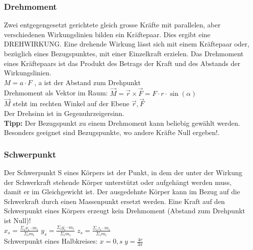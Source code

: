 \subsubsection{Drehmoment}
\begin{minipage}{15cm}
Zwei entgegengesetzt gerichtete gleich grosse Kräfte mit 
parallelen, aber verschiedenen Wirkungslinien bilden ein 
Kräftepaar. Dies ergibt eine DREHWIRKUNG.
Eine drehende Wirkung lässt sich mit einem Kräftepaar oder, 
bezüglich eines Bezugspunktes, mit einer Einzelkraft erzielen.
Das Drehmoment eines Kräftepaars ist das Produkt des Betrags der Kraft und des Abstands der Wirkungslinien. \\
$M = a \cdot F$ , a ist der Abstand zum Drehpunkt \\
Drehmoment als Vektor im Raum: $\overrightarrow{M} = \overrightarrow{r} \times \overrightarrow{F} = F \cdot r \cdot \sin(\alpha)$ \\
 $\overrightarrow{M}$ steht im rechten Winkel auf der Ebene $\overrightarrow{r},  \overrightarrow{F}$ \\
Der Drehsinn ist in Gegenuhrzeigersinn. \\
\textbf{Tipp:} Der Bezugspunkt zu einem Drehmoment kann beliebig gewählt werden. Besonders geeignet sind Bezugspunkte, wo andere Kräfte Null ergeben!.  
\end{minipage}
\begin{minipage}{4cm}
\end{minipage}

\subsubsection{Schwerpunkt}
Der Schwerpunkt S eines Körpers ist der Punkt, in dem der unter der Wirkung der Schwerkraft stehende Körper unterstützt oder aufgehängt werden muss, damit er im Gleichgewicht ist. Der ausgedehnte Körper kann im Bezug auf die Schwerkraft durch einen Massenpunkt ersetzt werden. Eine Kraft auf den Schwerpunkt eines Körpers erzeugt kein Drehmoment (Abstand zum Drehpunkt ist Null)! \\
$ x_s = \frac{\Sigma_{i} x_{i} \cdot m_{i}}{\Sigma_{i} m_{i}}$
$ y_s = \frac{\Sigma_{i} y_{i} \cdot m_{i}}{\Sigma_{i} m_{i}}$
$ z_s = \frac{\Sigma_{i} z_{i} \cdot m_{i}}{\Sigma_{i} m_{i}}$ \\
Schwerpunkt eines Halbkreises: $x = 0,s \; y = \frac{4r}{3\pi}$ \\


